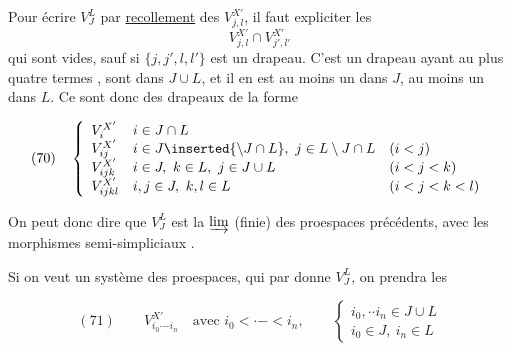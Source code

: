 
Pour écrire $V_J^L$ par \uline{recollement} des $V_{j,l}^{X'}$, il faut expliciter les
\[
V_{j,l}^{X'}\cap V_{j',l'}^{X'}
\]
qui sont vides, sauf si $\{j,j',l,l'\}$ est un drapeau. C'est un drapeau  ayant au plus quatre termes ,   sont dans $J\cup L$, et il en est au  moins un dans $J$, au moins un dans $L$. Ce sont donc des drapeaux de la forme


\[
(70)\quad\left\{\begin{array}{lll}
V_i^{X'}&i\in J\cap L&\\
V_{ij}^{X'}&i\in J\inserted{\setminus J\cap L},\ j\in L\setminus J\cap L&(i<j)\\
V_{ijk}^{X'}&i\in J,\ k\in L,\ j\in J\cup L&(i<j<k)\\
V_{ijkl}^{X'}&i,j\in J,\ k,l\in L&(i<j<k<l)
\end{array}\right.
\]


On peut donc dire que $V_J^L$ est la $\varinjlim$ (finie) des proespaces précédents, avec  les morphismes semi-simpliciaux  .

Si on veut un système  des proespaces,  qui par  \inserted{$\unsure{\varinjlim|\underline{\lim}}$} donne $V_J^L$, on prendra les

\[
(71)\qquad V_{i_0\mathord{\cdot}\mathord{-}i_n}^{X'}\quad\text{avec }i_0<\mathord{\cdot}\mathord{-}<i_n,\qquad
\left\{\begin{array}{l}
i_0,\mathord{\cdot}\mathord{\cdot}i_n\in J\cup L\\
i_0\in J,\ i_n\in L
\end{array}\right.
\]

